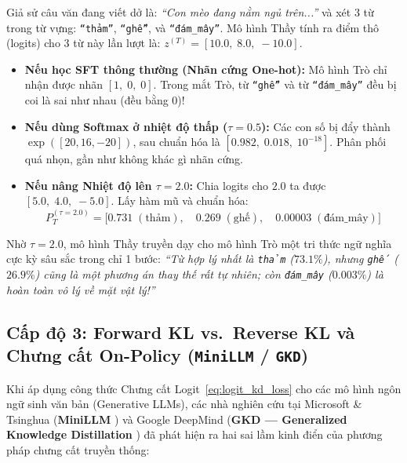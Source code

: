 \begin{mathdecode}
Giả sử câu văn đang viết dở là: \textit{``Con mèo đang nằm ngủ trên...''} và xét 3 từ trong từ vựng: \texttt{``thảm''}, \texttt{``ghế''}, và \texttt{``đám\_mây''}.
Mô hình Thầy tính ra điểm thô (logits) cho 3 từ này lần lượt là: $z^{(T)} = [10.0, \; 8.0, \; -10.0]$.

\begin{itemize}
  \item \textbf{Nếu học SFT thông thường (Nhãn cứng One-hot):} Mô hình Trò chỉ nhận được nhãn $[1, \; 0, \; 0]$. Trong mắt Trò, từ \texttt{``ghế''} và từ \texttt{``đám\_mây''} đều bị coi là sai như nhau (đều bằng $0$)!
  \item \textbf{Nếu dùng Softmax ở nhiệt độ thấp ($\tau = 0.5$):} Các con số bị đẩy thành $\exp([20, 16, -20])$, sau chuẩn hóa là $[0.982, \; 0.018, \; 10^{-18}]$. Phân phối quá nhọn, gần như không khác gì nhãn cứng.
  \item \textbf{Nếu nâng Nhiệt độ lên $\tau = 2.0$:} Chia logits cho $2.0$ ta được $[5.0, \; 4.0, \; -5.0]$. Lấy hàm mũ và chuẩn hóa:
  \begin{equation*}
    P_T^{(\tau=2.0)} = \big[ \mathbf{0.731} \; (\text{thảm}), \quad \mathbf{0.269} \; (\text{ghế}), \quad \mathbf{0.00003} \; (\text{đám\_mây}) \big]
  \end{equation*}
\end{itemize}
Nhờ $\tau = 2.0$, mô hình Thầy truyền dạy cho mô hình Trò một tri thức ngữ nghĩa cực kỳ sâu sắc trong chỉ 1 bước: \textit{``Từ hợp lý nhất là \texttt{thảm} ($73.1\%$), nhưng \texttt{ghế} ($26.9\%$) cũng là một phương án thay thế rất tự nhiên; còn \texttt{đám\_mây} ($0.003\%$) là hoàn toàn vô lý về mặt vật lý!''}
\end{mathdecode}

\subsection{Cấp độ 3: Forward KL vs.~Reverse KL và Chưng cất On-Policy (\texttt{MiniLLM} / \texttt{GKD})}

Khi áp dụng công thức Chưng cất Logit~\eqref{eq:logit_kd_loss} cho các mô hình ngôn ngữ sinh văn bản (Generative LLMs), các nhà nghiên cứu tại Microsoft \& Tsinghua (\textbf{MiniLLM} \citealt{gu2024minillm}) và Google DeepMind (\textbf{GKD --- Generalized Knowledge Distillation} \citealt{agarwal2024onpolicy}) đã phát hiện ra hai sai lầm kinh điển của phương pháp chưng cất truyền thống:

